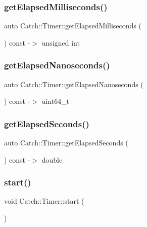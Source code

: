 \mbox{\label{class_catch_1_1_timer_a30aaf458dbb59dd8ac8971c9c62e0eac}} 
\subsubsection{getElapsedMilliseconds()}
{\footnotesize\ttfamily auto Catch\+::\+Timer\+::get\+Elapsed\+Milliseconds (\begin{DoxyParamCaption}{ }\end{DoxyParamCaption}) const -\/$>$  unsigned int}

\mbox{\label{class_catch_1_1_timer_a57be5d17ca868a2d6fb1eea84de665cf}} 
\subsubsection{getElapsedNanoseconds()}
{\footnotesize\ttfamily auto Catch\+::\+Timer\+::get\+Elapsed\+Nanoseconds (\begin{DoxyParamCaption}{ }\end{DoxyParamCaption}) const -\/$>$  uint64\+\_\+t}

\mbox{\label{class_catch_1_1_timer_a065e37e3c9eb16bd4dcf41971d8deedc}} 
\subsubsection{getElapsedSeconds()}
{\footnotesize\ttfamily auto Catch\+::\+Timer\+::get\+Elapsed\+Seconds (\begin{DoxyParamCaption}{ }\end{DoxyParamCaption}) const -\/$>$  double}

\mbox{\label{class_catch_1_1_timer_a0a56e879e43f36c102bf9ea8b5fc8b72}} 
\subsubsection{start()}
{\footnotesize\ttfamily void Catch\+::\+Timer\+::start (\begin{DoxyParamCaption}{ }\end{DoxyParamCaption})}



